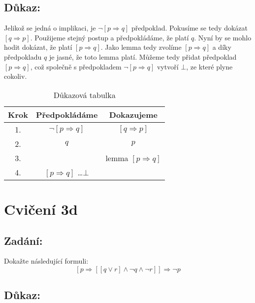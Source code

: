 \documentclass{article}
\begin{document}
\subsection{Důkaz:}

Jelikož se jedná o implikaci, je $\neg [p \Rightarrow q]$ předpoklad. Pokusíme se tedy dokázat $[q \Rightarrow p]$. Použijeme stejný postup a předpokládáme, že platí $q$. Nyní by se mohlo hodit dokázat, že platí $[p \Rightarrow q]$. Jako lemma tedy zvolíme $[p \Rightarrow q]$ a díky předpokladu $q$ je jasné, že toto lemma platí. Můžeme tedy přidat předpoklad $[p \Rightarrow q]$, což společně s předpokladem $\neg [p \Rightarrow q]$ vytvoří $\bot$, ze které plyne cokoliv.

\begin{table}[H]\centering

    \caption{Důkazová tabulka}

\begin{tabular}{|c|c|c|}
    
    
        \hline \textbf{Krok} & \textbf{Předpokládáme} & \textbf{Dokazujeme} \\ \hline \hline
    	1. & $\neg [p \Rightarrow q]$ & $[q \Rightarrow p]$ \\ \hline
    	2. & $q$ & $p$ \\ \hline
    	3. &  & lemma $[p \Rightarrow q]$ \\ \hline
    	4. & $[p \Rightarrow q]$ \dots $\bot$  &  \\ \hline
    
            
    	\end{tabular}
\end{table}

\section{Cvičení 3d}

\subsection{Zadání:}

Dokažte následující formuli:
$$[p \Rightarrow [[q \lor r] \wedge \neg q \wedge \neg r]] \Rightarrow \neg p$$

\subsection{Důkaz:}
\end{document}
